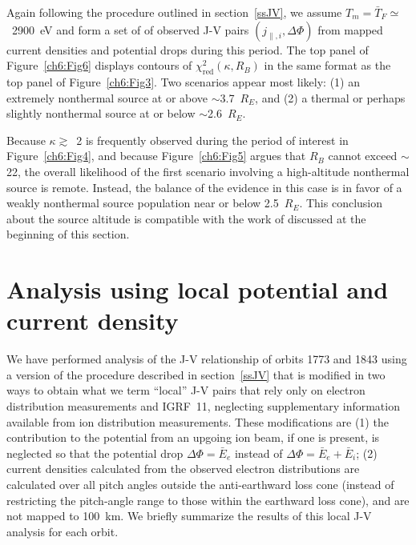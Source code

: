  
  Again following the procedure outlined in section~\ref{ssJV}, we assume
  $T_m = \bar{T}_F \simeq$~2900~eV and form a set of of observed J-V pairs
  $( j_{\parallel,i} , \Delta \Phi )$ from mapped current densities and
  potential drops during this period. The top panel of Figure~\ref{ch6:Fig6}
  displays contours of $\chi^2_{\textrm{red}} ( \kappa, R_B )$ in the same
  format as the top panel of Figure~\ref{ch6:Fig3}. Two scenarios appear most
  likely: (1) an extremely nonthermal source at or above $\sim$3.7~$R_E$, and
  (2) a thermal or perhaps slightly nonthermal source at or below
  $\sim$2.6~$R_E$.

  Because $\kappa \gtrsim$~2 is frequently observed during the period of
  interest in Figure~\ref{ch6:Fig4}, and because Figure~\ref{ch6:Fig5} argues
  that $R_B$ cannot exceed $\sim$22, the overall likelihood of the first
  scenario involving a high-altitude nonthermal source is remote. Instead, the
  balance of the evidence in this case is in favor of a weakly nonthermal source
  population near or below 2.5~$R_E$. This conclusion about the source altitude
  is compatible with the work of \citet{Ergun1998} discussed at the beginning of
  this section.
  
  \section{Analysis using local potential and current density}

  We have performed analysis of the J-V relationship of orbits 1773 and 1843
  using a version of the procedure described in section~\ref{ssJV} that is
  modified in two ways to obtain what we term ``local'' J-V pairs that rely only
  on electron distribution measurements and IGRF~11, neglecting supplementary
  information available from ion distribution measurements. These modifications
  are (1) the contribution to the potential from an upgoing ion beam, if one is
  present, is neglected so that the potential drop $\Delta \Phi = \bar{E}_e$
  instead of $\Delta \Phi = \bar{E}_e + \bar{E}_i$; (2) current densities
  calculated from the observed electron distributions are calculated over all
  pitch angles outside the anti-earthward loss cone (instead of restricting the
  pitch-angle range to those within the earthward loss cone), and are not mapped
  to 100~km. We briefly summarize the results of this local J-V analysis for
  each orbit.

